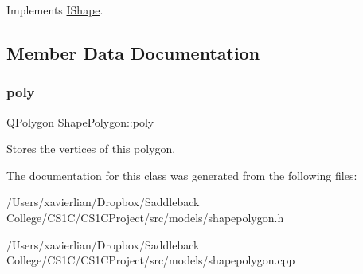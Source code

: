Implements \mbox{\hyperlink{class_i_shape_a485f6770c4e56b31c76d368b959b6f00}{I\+Shape}}.



\subsection{Member Data Documentation}
\mbox{\label{class_shape_polygon_a28be8d33f69f3e0e895acd9d574a814f}} 
\subsubsection{\texorpdfstring{poly}{poly}}
{\footnotesize\ttfamily Q\+Polygon Shape\+Polygon\+::poly}

Stores the vertices of this polygon. 

The documentation for this class was generated from the following files\+:\begin{DoxyCompactItemize}
\item 
/\+Users/xavierlian/\+Dropbox/\+Saddleback College/\+C\+S1\+C/\+C\+S1\+C\+Project/src/models/shapepolygon.\+h\item 
/\+Users/xavierlian/\+Dropbox/\+Saddleback College/\+C\+S1\+C/\+C\+S1\+C\+Project/src/models/shapepolygon.\+cpp\end{DoxyCompactItemize}

